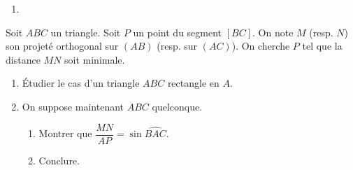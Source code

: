 \documentclass[a4paper,12pt,reqno]{amsart}
\begin{document}
\begin{solution}
\begin{enumerate}
{      }
    \item
  \end{enumerate}

\end{solution}


\begin{exo}

  Soit $ABC$ un triangle. Soit $P$ un  point  du segment $[BC]$. On note $M$ (resp. $N$) son projeté orthogonal sur $(AB)$ (resp. sur $(AC)$). On cherche $P$ tel que la distance $MN$ soit minimale.
  \begin{enumerate}
    \item Étudier le cas d'un triangle $ABC$ rectangle en $A$.
    \item On suppose maintenant $ABC$ quelconque.
    \begin{enumerate}
      \item Montrer que $\dfrac{MN}{AP}=\sin{\widehat{BAC}}$.
      \item Conclure.
    \end{enumerate}
  \end{enumerate}

\end{exo}
\end{document}
